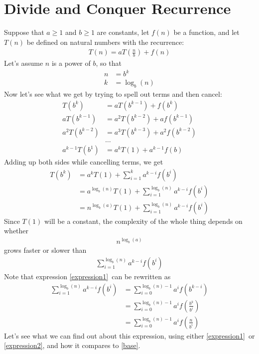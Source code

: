 \documentclass{article}
\begin{document}
\section{Divide and Conquer Recurrence}
Suppose that $a\geq 1$ and $b\geq 1$ are constants, let $f(n)$ be a
function, and let $T(n)$ be defined on natural numbers with
the recurrence:
\LARGE
\begin{align}
T(n) = aT\left(\frac{n}{b}\right) + f(n)
\end{align}
\normalsize
Let's assume $n$ is a power of $b$, so that
\LARGE
\begin{align}
n &= b^k\\
k&=\log_b(n)\end{align}
\normalsize
Now 
let's see what we get by trying to spell out terms and then cancel:
\LARGE
\begin{align}
T(b^k) &= aT(b^{k-1}) + f(b^k)\\
aT(b^{k-1})
&=
a^2T(b^{k-2}) + af(b^{k-1})
\\
a^2T(b^{k-2})
&=
a^3T(b^{k-3}) + a^2f(b^{k-2})
\\
&\ldots
\\
a^{k-1}T(b^{1})
&=
a^kT(1) + a^{k-1}f(b)
\end{align}
\normalsize
Adding up both sides while cancelling terms, we get
\LARGE
\begin{align}
T(b^k) &= a^kT(1) + \sum_{i=1}^{k} a^{k-i}f(b^{i})
\\
&=
a^{\log_b(n)}T(1) + \sum_{i=1}^{\log_b(n)} a^{k-i}f(b^{i})
\\
&=
n^{\log_b(a)}T(1) + \sum_{i=1}^{\log_b(n)} a^{k-i}f(b^{i}) \label{tcomplexity}
\end{align}
\normalsize
Since $T(1)$ will be a constant, the complexity of the whole thing
depends on whether 
\LARGE
\begin{align} n^{\log_b(a)}\label{base}\end{align}
\normalsize
grows faster or slower than
\LARGE
\begin{align}
  \sum_{i=1}^{\log_b(n)} a^{k-i}f(b^{i}) \label{expression1}
\end{align}
\normalsize
Note that expression \ref{expression1}\ can be rewritten as
\LARGE
\begin{align}
    \sum_{i=1}^{\log_b(n)} a^{k-i}f(b^{i})
  &=   \sum_{i=0}^{\log_b(n)-1} a^{i}f(b^{k-i}) \\
  &=   \sum_{i=0}^{\log_b(n)-1} a^{i}f\left(\frac{b^{k}}{b^{i}}\right)\\
  &=   \sum_{i=0}^{\log_b(n)-1} a^{i}f\left(\frac{n}{b^{i}}\right)
\label{expression2}
\end{align}
\normalsize
Let's see what we can find out about this expression, using either
\ref{expression1}\ or \ref{expression2}, and how it compares to
\ref{base}. 
\end{document}
